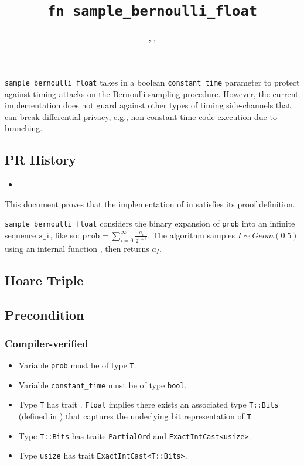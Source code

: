 \documentclass{article}
\title{\texttt{fn sample\_bernoulli\_float}}
\author{\VickiXuAuthor, \HanwenZhangAuthor, \ZacharyRatliffAuthor}
\begin{document}
\maketitle

\contrib
\begin{tcolorbox}
    \begin{warning}
     \texttt{sample\_bernoulli\_float} takes in a boolean \texttt{constant\_time} parameter to protect against timing attacks on the Bernoulli sampling procedure. However, the current implementation does not guard against other types of timing side-channels that can break differential privacy, e.g., non-constant time code execution due to branching.
    \end{warning}
\end{tcolorbox}

\subsection*{PR History}
\begin{itemize}
    \item {}
\end{itemize}

This document proves that the implementation of  in 
satisfies its proof definition.

\texttt{sample\_bernoulli\_float} considers the binary expansion of \texttt{prob} into an infinite sequence $\texttt{a\_i}$,
like so: $\texttt{prob} = \sum_{i = 0}^{\infty} \frac{a_i}{2^{i + 1}}$.
The algorithm samples $I \sim Geom(0.5)$ using an internal function , then returns $a_I$.

\subsection{Hoare Triple}
\subsection*{Precondition}
\subsubsection*{Compiler-verified}
\begin{itemize}
    \item Variable \texttt{prob} must be of type \texttt{T}.
    \item Variable \texttt{constant\_time} must be of type \texttt{bool}.
    \item Type \texttt{T} has trait .
        \texttt{Float} implies there exists an associated type \texttt{T::Bits} (defined in ) that captures the underlying bit representation of \texttt{T}.
    \item Type \texttt{T::Bits} has traits \texttt{PartialOrd} and \texttt{ExactIntCast<usize>}.
    \item Type \texttt{usize} has trait \texttt{ExactIntCast<T::Bits>}.
\end{itemize}
\end{document}

